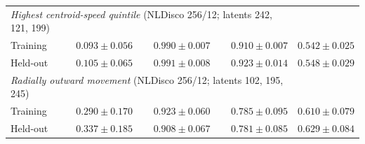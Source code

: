 \begin{tabular*}{\linewidth}{@{\extracolsep{\fill}}lrrrr@{}}
\midrule
\multicolumn{4}{l}{\textit{Highest centroid-speed quintile} (NLDisco 256/12; latents 242, 121, 199)} \\
Training & $0.093{\pm}0.056$ & $0.990{\pm}0.007$ & $0.910{\pm}0.007$ & $0.542{\pm}0.025$ \\
Held-out & $0.105{\pm}0.065$ & $0.991{\pm}0.008$ & $0.923{\pm}0.014$ & $0.548{\pm}0.029$ \\
\midrule
\multicolumn{4}{l}{\textit{Radially outward movement} (NLDisco 256/12; latents 102, 195, 245)} \\
Training & $0.290{\pm}0.170$ & $0.923{\pm}0.060$ & $0.785{\pm}0.095$ & $0.610{\pm}0.079$ \\
Held-out & $0.337{\pm}0.185$ & $0.908{\pm}0.067$ & $0.781{\pm}0.085$ & $0.629{\pm}0.084$ \\
\bottomrule
\end{tabular*}
